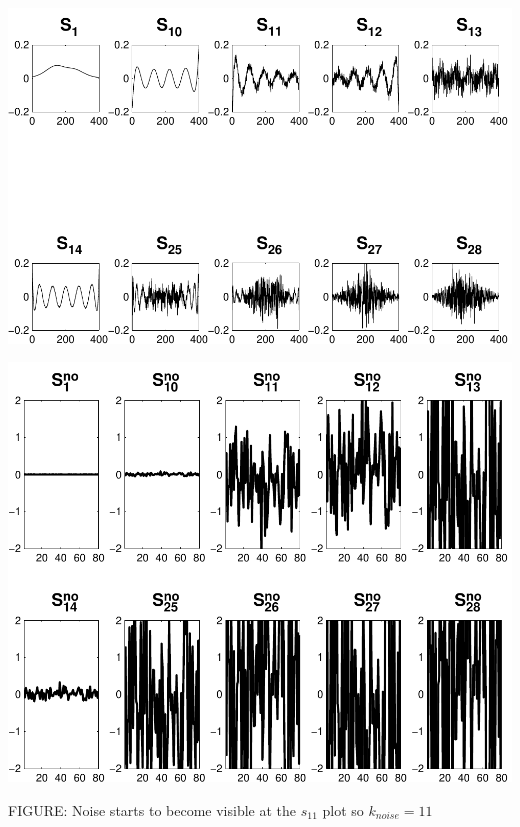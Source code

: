\documentclass[11pt]{amsart}
\begin{document}
	\vspace{5mm}
	\begin{minipage}[t]{0.5\textwidth}
	
		\includegraphics[width=.95\linewidth]{figures/run2/sk_plots} 
   
	\end{minipage}
	\begin{minipage}[t]{0.5\textwidth}
	
		\includegraphics[width=.75\linewidth]{figures/run2/noise_parts} 
   
	\end{minipage}
	\begin{center}
		FIGURE: 
		Noise starts to become visible at the $s_{11}$ plot so $k_{noise}=11$
	\end{center} 
	\vspace{5mm}
	
\end{document}

